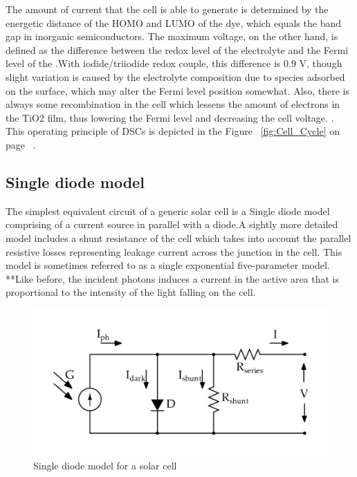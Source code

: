 The amount of current that the cell is able to generate is determined by the energetic distance of the \ac{HOMO} and \ac{LUMO} of the dye, which equals the band gap in inorganic semiconductors. The maximum voltage, on the other hand, is defined as the difference between the redox level of the electrolyte and the Fermi level of the .With iodide/triiodide redox couple, this difference is 0.9 V, though slight variation is caused by the electrolyte composition due to species adsorbed on the  surface, which may alter the Fermi level position somewhat. Also, there is always some recombination in the cell which lessens the amount of electrons in the TiO2 film, thus lowering the Fermi level and decreasing the cell voltage. \cite{toivola2010dye}.  This operating principle of \ac{DSCs} is depicted in the Figure ~\ref{fig:Cell_Cycle} on page ~\pageref{fig:Cell_Cycle}. \\


  
  
\subsection{Single diode model}\label{sec:SDM}
The simplest equivalent circuit of a generic solar cell is a Single diode model comprising of a current source in parallel with a diode.A sightly more detailed model includes a shunt resistance of the cell which takes into account the parallel resistive losses representing leakage current across the junction in the cell. This model is sometimes referred to as a single exponential five-parameter model\cite{vignati2012solutions}. **Like before, the incident photons induces a current in the active area that is proportional to the intensity of the light falling on the cell.

 \begin{figure}[H]
  \begin{center}
  \includegraphics[width=\textwidth]{images/simplified_single_diode_model}
  \caption{ Single diode model for a solar cell }
  \label{fig:EQu_cell}
  \end{center}
  \end{figure}
  
